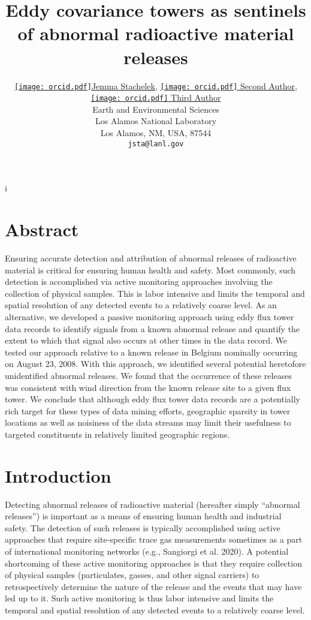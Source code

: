 i\documentclass{article}
\title{Eddy covariance towers as sentinels of abnormal radioactive material releases}
\date{} 					%
\author{
	\href{https://orcid.org/0000-0002-5924-2464}{\texttt{[image: orcid.pdf]}\hspace{1mm}Jemma Stachelek},
	\href{https://orcid.org/0000}{\texttt{[image: orcid.pdf]}\hspace{1mm}
	 Second Author},
	\href{https://orcid.org/0000}{\texttt{[image: orcid.pdf]}\hspace{1mm}
	 Third Author} \\
	Earth and Environmental Sciences\\
	Los Alamos National Laboratory\\
	Los Alamos, NM, USA, 87544 \\
	\texttt{jsta@lanl.gov} \\
}
\begin{document}
\maketitle
\doublespacing

\section*{Abstract}	
    Ensuring accurate detection and attribution of abnormal releases of radioactive material is critical for ensuring human health and safety. Most commonly, such detection is accomplished via active monitoring approaches involving the collection of physical samples. This is labor intensive and limits the temporal and spatial resolution of any detected events to a relatively coarse level. As an alternative, we developed a passive monitoring approach using eddy flux tower data records to identify signals from a known abnormal release and quantify the extent to which that signal also occurs at other times in the data record. We tested our approach relative to a known release in Belgium nominally occurring on August 23, 2008. With this approach, we identified several potential heretofore unidentified abnormal releases. We found that the occurrence of these releases was consistent with wind direction from the known release site to a given flux tower. We conclude that although eddy flux tower data records are a potentially rich target for these types of data mining efforts, geographic sparsity in tower locations as well as noisiness of the data streams may limit their usefulness to targeted constituents in relatively limited geographic regions.

\section{Introduction}
Detecting abnormal releases of radioactive material (hereafter simply “abnormal releases”) is important as a means of ensuring human health and industrial safety. The detection of such releases is typically accomplished using active approaches that require site-specific trace gas measurements \citep{carriganTraceGasEmissions1996} sometimes as a part of international monitoring networks (e.g., Sangiorgi et al. 2020). A potential shortcoming of these active monitoring approaches is that they require collection of physical samples (particulates, gasses, and other signal carriers) to retrospectively determine the nature of the release and the events that may have led up to it. Such active monitoring is thus labor intensive and limits the temporal and spatial resolution of any detected events to a relatively coarse level. 
\end{document}
